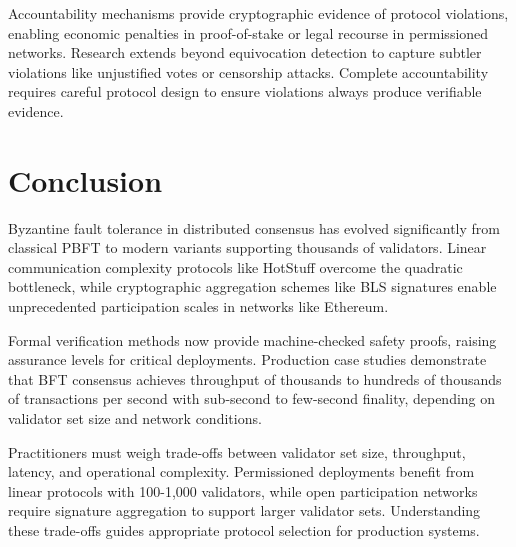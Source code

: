 \documentclass{article}
\begin{document}
Accountability mechanisms provide cryptographic evidence of protocol violations, enabling economic penalties in proof-of-stake or legal recourse in permissioned networks. Research extends beyond equivocation detection to capture subtler violations like unjustified votes or censorship attacks. Complete accountability requires careful protocol design to ensure violations always produce verifiable evidence.

\section{Conclusion}

Byzantine fault tolerance in distributed consensus has evolved significantly from classical PBFT to modern variants supporting thousands of validators. Linear communication complexity protocols like HotStuff overcome the quadratic bottleneck, while cryptographic aggregation schemes like BLS signatures enable unprecedented participation scales in networks like Ethereum.

Formal verification methods now provide machine-checked safety proofs, raising assurance levels for critical deployments. Production case studies demonstrate that BFT consensus achieves throughput of thousands to hundreds of thousands of transactions per second with sub-second to few-second finality, depending on validator set size and network conditions.

Practitioners must weigh trade-offs between validator set size, throughput, latency, and operational complexity. Permissioned deployments benefit from linear protocols with 100-1,000 validators, while open participation networks require signature aggregation to support larger validator sets. Understanding these trade-offs guides appropriate protocol selection for production systems.
\end{document}
